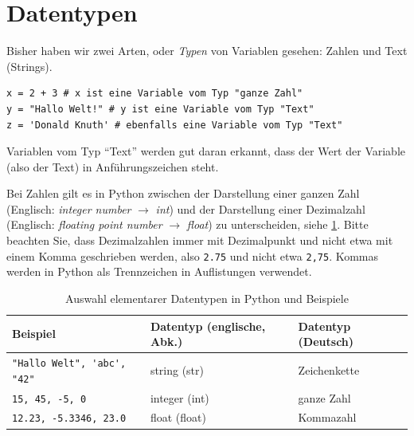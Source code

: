\section{Datentypen}
Bisher haben wir zwei Arten, oder \emph{Typen} von Variablen gesehen: Zahlen und Text (Strings).

\begin{lstlisting}
x = 2 + 3 # x ist eine Variable vom Typ "ganze Zahl"
y = "Hallo Welt!" # y ist eine Variable vom Typ "Text"
z = 'Donald Knuth' # ebenfalls eine Variable vom Typ "Text"
\end{lstlisting}

Variablen vom Typ \enquote{Text} werden gut daran erkannt, dass der Wert der Variable (also der Text) in Anführungszeichen steht.

Bei Zahlen gilt es in Python zwischen der Darstellung einer ganzen Zahl (Englisch: \emph{integer number} $\rightarrow$ \emph{int}) und der Darstellung einer Dezimalzahl (Englisch: \emph{floating point number} $\rightarrow$ \emph{float}) zu unterscheiden, siehe \cref{tab:datatypes}. Bitte beachten Sie, dass Dezimalzahlen immer mit Dezimalpunkt und nicht etwa mit einem Komma geschrieben werden, also \lstinline|2.75| und nicht etwa \lstinline|2,75|. Kommas werden in Python als Trennzeichen in Auflistungen verwendet.

\begin{table}[H]
	\footnotesize
	\centering
	\begin{tabular}{l|l|l}
		\textbf{Beispiel}                     & \textbf{Datentyp (englische, Abk.)} & \textbf{Datentyp (Deutsch)} \\\midrule\midrule
		\lstinline|"Hallo Welt", 'abc', "42"| & string (str)                        & Zeichenkette                \\\midrule
		\lstinline|15, 45, -5, 0|             & integer (int)                       & ganze Zahl                  \\\midrule
		\lstinline|12.23, -5.3346, 23.0|      & float (float)                       & Kommazahl
	\end{tabular}
	\caption{Auswahl elementarer Datentypen in Python und Beispiele}
	\label{tab:datatypes}
\end{table}

